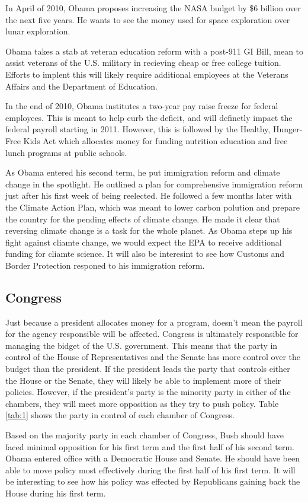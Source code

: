 \documentclass{article}
\begin{document}
        \par
        In April of 2010, Obama proposes increasing the NASA budget by \$6 billion over the next five years. He wants to see the money used for space exploration over lunar exploration.\cite{obamaevents}
        \par
        Obama takes a stab at veteran education reform with a post-911 GI Bill, mean to assist veterans of the U.S. military in recieving cheap or free college tuition.\cite{obamaevents} Efforts to implent this will likely require additional employees at the Veterans Affairs and the Department of Education.
        \par
        In the end of 2010, Obama institutes a two-year pay raise freeze for federal employees. This is meant to help curb the deficit, and will definetly impact the federal payroll starting in 2011. However, this is followed by the Healthy, Hunger-Free Kids Act which allocates money for funding nutrition education and free lunch programs at public schools.
        \par
        As Obama entered his second term, he put immigration reform and climate change in the spotlight. He outlined a plan for comprehensive immigration reform just after his first week of being reelected. He followed a few months later with the Climate Action Plan, which was meant to lower carbon polution and prepare the country for the pending effects of climate change. He made it clear that reversing climate change is a task for the whole planet.\cite{obamaevents} As Obama steps up his fight against cliamte change, we would expect the EPA to receive additional funding for cliamte science. It will also be interesint to see how Customs and Border Protection responed to his immigration reform.

    \subsection{Congress}
    Just because a president allocates money for a program, doesn't mean the payroll for the agency responsible will be affected. Congress is ultimately responsible for managing the bidget of the U.S. government. This means that the party in control of the House of Representatives and the Senate has more control over the budget than the president. If the president leads the party that controls either the House or the Senate, they will likely be able to implement more of their policies. However, if the president's party is the minority party in either of the chambers, they will meet more opposition as they try to push policy. Table \ref{tab:1} shows the party in control of each chamber of Congress.
    \par
    Based on the majority party in each chamber of Congress, Bush should have faced minimal opposition for his first term and the first half of his second term. Obama entered office with a Democratic House and Senate. He should have been able to move policy most effectively during the first half of his first term. It will be interesting to see how his policy was effected by Republicans gaining back the House during his first term.
\end{document}
